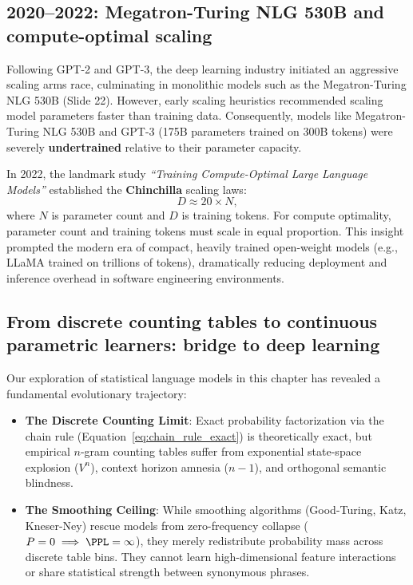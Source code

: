 \documentclass[../../main.tex]{subfiles}
\begin{document}
\subsection{2020--2022: Megatron-Turing NLG 530B and compute-optimal scaling}
\label{subsec:milestone_scaling}

Following GPT-2 and GPT-3, the deep learning industry initiated an aggressive scaling arms race, culminating in monolithic models such as the Megatron-Turing NLG 530B (Slide 22). However, early scaling heuristics \cite{kaplan2020} recommended scaling model parameters faster than training data. Consequently, models like Megatron-Turing NLG 530B and GPT-3 (175B parameters trained on 300B tokens) were severely \textbf{undertrained} relative to their parameter capacity.

In 2022, the landmark study \textit{``Training Compute-Optimal Large Language Models''} \cite{hoffmann2022} established the \textbf{Chinchilla} scaling laws:
\begin{equation}
\label{eq:chinchilla_ratio}
D \approx 20 \times N,
\end{equation}
where $N$ is parameter count and $D$ is training tokens. For compute optimality, parameter count and training tokens must scale in equal proportion. This insight prompted the modern era of compact, heavily trained open-weight models (e.g., LLaMA \cite{touvron2023llama} trained on trillions of tokens), dramatically reducing deployment and inference overhead in software engineering environments.

\subsection{From discrete counting tables to continuous parametric learners: bridge to deep learning}
\label{subsec:bridge_to_ch02}

Our exploration of statistical language models in this chapter has revealed a fundamental evolutionary trajectory:
\begin{itemize}
    \item \textbf{The Discrete Counting Limit}: Exact probability factorization via the chain rule (Equation~\eqref{eq:chain_rule_exact}) is theoretically exact, but empirical $n$-gram counting tables suffer from exponential state-space explosion ($V^n$), context horizon amnesia ($n-1$), and orthogonal semantic blindness.
    \item \textbf{The Smoothing Ceiling}: While smoothing algorithms (Good-Turing, Katz, Kneser-Ney) rescue models from zero-frequency collapse ($P=0 \implies \PPL=\infty$), they merely redistribute probability mass across discrete table bins. They cannot learn high-dimensional feature interactions or share statistical strength between synonymous phrases.
\end{itemize}
\end{document}

